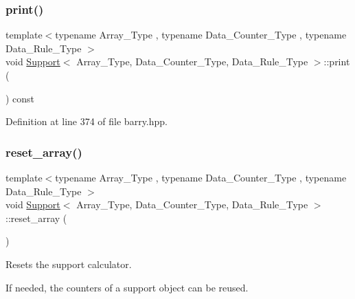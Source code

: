 \mbox{\label{classbarry_1_1_support_af87b2e85ec72e394387946023508e7fd}} 
\subsubsection{\texorpdfstring{print()}{print()}}
{\footnotesize\ttfamily template$<$typename Array\+\_\+\+Type , typename Data\+\_\+\+Counter\+\_\+\+Type , typename Data\+\_\+\+Rule\+\_\+\+Type $>$ \\
void \hyperlink{classbarry_1_1_support}{Support}$<$ Array\+\_\+\+Type, Data\+\_\+\+Counter\+\_\+\+Type, Data\+\_\+\+Rule\+\_\+\+Type $>$\+::print (\begin{DoxyParamCaption}{ }\end{DoxyParamCaption}) const\hspace{0.3cm}{\ttfamily [inline]}}



Definition at line 374 of file barry.\+hpp.

\mbox{\label{classbarry_1_1_support_a4f2860fd2e8e30703b91633a92ed7a58}} 
\subsubsection{\texorpdfstring{reset\+\_\+array()}{reset\_array()}\hspace{0.1cm}{\footnotesize\ttfamily [1/2]}}
{\footnotesize\ttfamily template$<$typename Array\+\_\+\+Type , typename Data\+\_\+\+Counter\+\_\+\+Type , typename Data\+\_\+\+Rule\+\_\+\+Type $>$ \\
void \hyperlink{classbarry_1_1_support}{Support}$<$ Array\+\_\+\+Type, Data\+\_\+\+Counter\+\_\+\+Type, Data\+\_\+\+Rule\+\_\+\+Type $>$\+::reset\+\_\+array (\begin{DoxyParamCaption}{ }\end{DoxyParamCaption})\hspace{0.3cm}{\ttfamily [inline]}}



Resets the support calculator. 

If needed, the counters of a support object can be reused.


